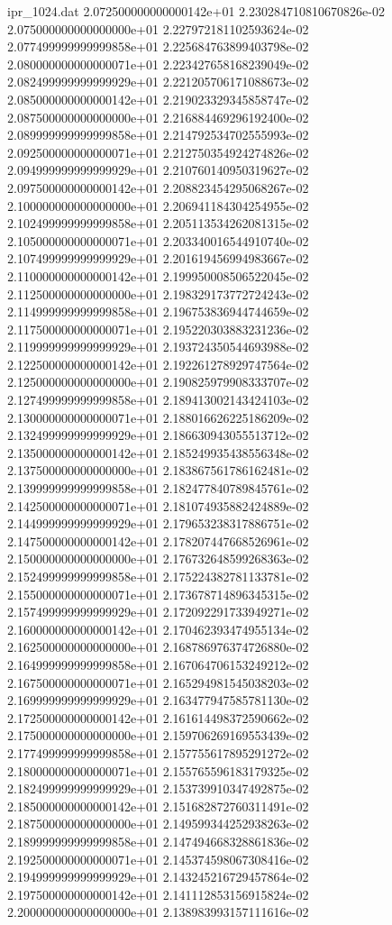 \begin{filecontents}{ipr_1024.dat}
2.072500000000000142e+01 2.230284710810670826e-02
2.075000000000000000e+01 2.227972181102593624e-02
2.077499999999999858e+01 2.225684763899403798e-02
2.080000000000000071e+01 2.223427658168239049e-02
2.082499999999999929e+01 2.221205706171088673e-02
2.085000000000000142e+01 2.219023329345858747e-02
2.087500000000000000e+01 2.216884469296192400e-02
2.089999999999999858e+01 2.214792534702555993e-02
2.092500000000000071e+01 2.212750354924274826e-02
2.094999999999999929e+01 2.210760140950319627e-02
2.097500000000000142e+01 2.208823454295068267e-02
2.100000000000000000e+01 2.206941184304254955e-02
2.102499999999999858e+01 2.205113534262081315e-02
2.105000000000000071e+01 2.203340016544910740e-02
2.107499999999999929e+01 2.201619456994983667e-02
2.110000000000000142e+01 2.199950008506522045e-02
2.112500000000000000e+01 2.198329173772724243e-02
2.114999999999999858e+01 2.196753836944744659e-02
2.117500000000000071e+01 2.195220303883231236e-02
2.119999999999999929e+01 2.193724350544693988e-02
2.122500000000000142e+01 2.192261278929747564e-02
2.125000000000000000e+01 2.190825979908333707e-02
2.127499999999999858e+01 2.189413002143424103e-02
2.130000000000000071e+01 2.188016626225186209e-02
2.132499999999999929e+01 2.186630943055513712e-02
2.135000000000000142e+01 2.185249935438556348e-02
2.137500000000000000e+01 2.183867561786162481e-02
2.139999999999999858e+01 2.182477840789845761e-02
2.142500000000000071e+01 2.181074935882424889e-02
2.144999999999999929e+01 2.179653238317886751e-02
2.147500000000000142e+01 2.178207447668526961e-02
2.150000000000000000e+01 2.176732648599268363e-02
2.152499999999999858e+01 2.175224382781133781e-02
2.155000000000000071e+01 2.173678714896345315e-02
2.157499999999999929e+01 2.172092291733949271e-02
2.160000000000000142e+01 2.170462393474955134e-02
2.162500000000000000e+01 2.168786976374726880e-02
2.164999999999999858e+01 2.167064706153249212e-02
2.167500000000000071e+01 2.165294981545038203e-02
2.169999999999999929e+01 2.163477947585781130e-02
2.172500000000000142e+01 2.161614498372590662e-02
2.175000000000000000e+01 2.159706269169553439e-02
2.177499999999999858e+01 2.157755617895291272e-02
2.180000000000000071e+01 2.155765596183179325e-02
2.182499999999999929e+01 2.153739910347492875e-02
2.185000000000000142e+01 2.151682872760311491e-02
2.187500000000000000e+01 2.149599344252938263e-02
2.189999999999999858e+01 2.147494668328861836e-02
2.192500000000000071e+01 2.145374598067308416e-02
2.194999999999999929e+01 2.143245216729457864e-02
2.197500000000000142e+01 2.141112853156915824e-02
2.200000000000000000e+01 2.138983993157111616e-02

\end{filecontents}
